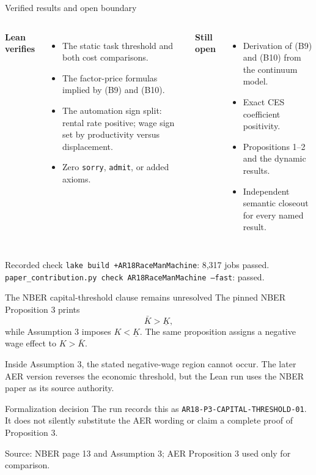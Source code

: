 \documentclass[aspectratio=169,11pt]{beamer}
\newcommand{\source}[1]{\vfill{\tiny\color{navy!70}Source: #1}}
\begin{document}
\begin{frame}{Verified results and open boundary}
  \begin{columns}[T,onlytextwidth]
      \textbf{Lean verifies}
      \begin{itemize}\small
        \item The static task threshold and both cost comparisons.
        \item The factor-price formulas implied by (B9) and (B10).
        \item The automation sign split: rental rate positive; wage sign set by productivity versus displacement.
        \item Zero \texttt{sorry}, \texttt{admit}, or added axioms.
      \end{itemize}
      \textbf{Still open}
      \begin{itemize}\small
        \item Derivation of (B9) and (B10) from the continuum model.
        \item Exact CES coefficient positivity.
        \item Propositions 1--2 and the dynamic results.
        \item Independent semantic closeout for every named result.
      \end{itemize}
  \end{columns}

  \begin{block}{Recorded check}
    \texttt{lake build +AR18RaceManMachine}: 8,317 jobs passed.\\
    \texttt{paper\_contribution.py check AR18RaceManMachine --fast}: passed.
  \end{block}
\end{frame}

\begin{frame}{The NBER capital-threshold clause remains unresolved}
  \small
  The pinned NBER Proposition 3 prints
  \[
    \bar K>\underline K,
  \]
  while Assumption 3 imposes $K<\underline K$. The same proposition assigns a
  negative wage effect to $K>\bar K$.

  \medskip
  Inside Assumption 3, the stated negative-wage region cannot occur. The later
  AER version reverses the economic threshold, but the Lean run uses the NBER
  paper as its source authority.

  \begin{block}{Formalization decision}
    The run records this as \texttt{AR18-P3-CAPITAL-THRESHOLD-01}. It does not
    silently substitute the AER wording or claim a complete proof of Proposition 3.
  \end{block}

  \source{NBER page 13 and Assumption 3; AER Proposition 3 used only for comparison.}
\end{frame}
\end{document}
